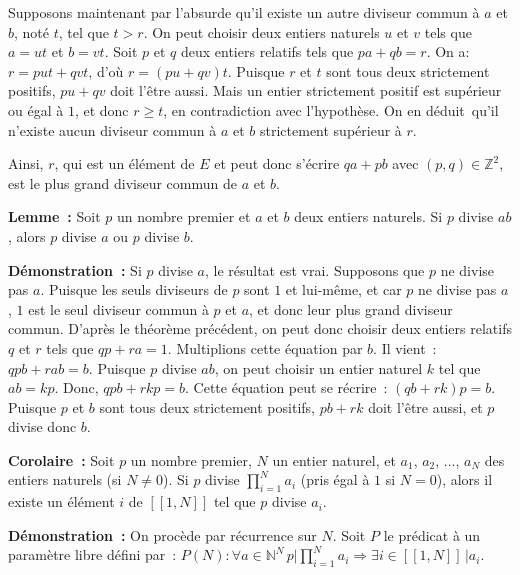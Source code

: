 Supposons maintenant par l'absurde qu'il existe un autre diviseur commun à $a$ et $b$, noté $t$, tel que $t > r$. 
On peut choisir deux entiers naturels $u$ et $v$ tels que $a = u t$ et $b = v t$. 
Soit $p$ et $q$ deux entiers relatifs tels que $p a + q b = r$. 
On a: $r = p u t + q v t$, d'où $r = (p u + q v) t$. 
Puisque $r$ et $t$ sont tous deux strictement positifs, $p u + q v$ doit l'être aussi. 
Mais un entier strictement positif est supérieur ou égal à $1$, et donc $r \geq t$, en contradiction avec l'hypothèse. 
On en déduit qu'il n'existe aucun diviseur commun à $a$ et $b$ strictement supérieur à $r$.

Ainsi, $r$, qui est un élément de $E$ et peut donc s'écrire $q a + p b$ avec $(p, q) \in \mathbb{Z}^2$, est le plus grand diviseur commun de $a$ et $b$.

\done

\medskip

\noindent\textbf{Lemme :} 
Soit $p$ un nombre premier et $a$ et $b$ deux entiers naturels. 
Si $p$ divise $a b$, alors $p$ divise $a$ ou $p$ divise $b$.

\medskip

\noindent\textbf{Démonstration :} 
Si $p$ divise $a$, le résultat est vrai. 
Supposons que $p$ ne divise pas $a$. 
Puisque les seuls diviseurs de $p$ sont $1$ et lui-même, et car $p$ ne divise pas $a$, $1$ est le seul diviseur commun à $p$ et $a$, et donc leur plus grand diviseur commun. 
D'après le théorème précédent, on peut donc choisir deux entiers relatifs $q$ et $r$ tels que $q p + r a = 1$. 
Multiplions cette équation par $b$. 
Il vient : $q p b + r a b = b$. 
Puisque $p$ divise $a b$, on peut choisir un entier naturel $k$ tel que $a b = k p$. 
Donc, $q p b + r k p = b$. 
Cette équation peut se récrire : $(q b + r k) p = b$. 
Puisque $p$ et $b$ sont tous deux strictement positifs, $p b + r k$ doit l'être aussi, et $p$ divise donc $b$.

\done

\bigskip
\noindent\textbf{Corolaire :} 
Soit $p$ un nombre premier, $N$ un entier naturel, et $a_1$, $a_2$, ..., $a_N$ des entiers naturels (si $N \neq 0$). 
Si $p$ divise $\prod_{i=1}^N a_i$ (pris égal à $1$ si $N = 0$), alors il existe un élément $i$ de $[\![1,N]\!]$ tel que $p$ divise $a_i$.

\medskip

\noindent\textbf{Démonstration :} 
On procède par récurrence sur $N$. 
Soit $P$ le prédicat à un paramètre libre défini par : $P(N): \forall a \in \mathbb{N}^N \, p \vert \prod_{i=1}^N a_i \Rightarrow \exists i \in [\![1,N]\!] \, \vert a_i$.

